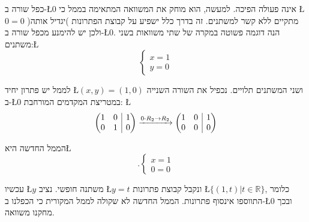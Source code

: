 \begin{remark}
כפל שורה ב-\L{$0$} אינה פעולה הפיכה. למעשה, הוא מוחק את המשוואה
המתאימה בממ\textquotedbl ל כי \L{$0=0$} מתקיים ללא קשר למשתנים.
זה בדרך כלל ישפיע על קבוצת הפתרונות )יגדיל אותה( ולכן יש להימנע מכפל
שורה ב-\L{$0$}. הנה דוגמה פשוטה במקרה של שתי משוואות בשני משתנים:\L{%
\[
\begin{cases}
x=1\\
y=0
\end{cases}
\]
}%

לממ\textquotedbl ל יש פתרון יחיד \L{$(x,y)=(1,0)$} ושני המשתנים
תלויים. נכפיל את השורה השנייה ב-\L{$0$} במטריצת המקדמים המורחבת:
\L{%
\[
\left( \begin{array}{@{}cc|c@{}}
1 & 0 & 1\\
0 & 1 & 0
\end{array}\right) \xrightarrow{0\cdot R_2\to R_2}
	\left( \begin{array}{@{}cc|c@{}}
	1 & 0 & 1\\
	0 & 0 & 0
\end{array} \right)
\]
}%

הממ\textquotedbl ל החדשה היא\L{%
\[
.\begin{cases}
x=1\\
0=0
\end{cases}
\]
}%

עכשיו \L{$y$} משתנה חופשי. נציב \L{$y=t$} ונקבל קבוצת פתרונות \L{$\{(1,t)|t\in\mathbb{R}\}$},
כלומר התווספו אינסוף פתרונות. הממ\textquotedbl ל החדשה לא שקולה לממ\textquotedbl ל
המקורית כי הכפלנו ב-\L{$0$} ובכך מחקנו משוואה.
\end{remark}

